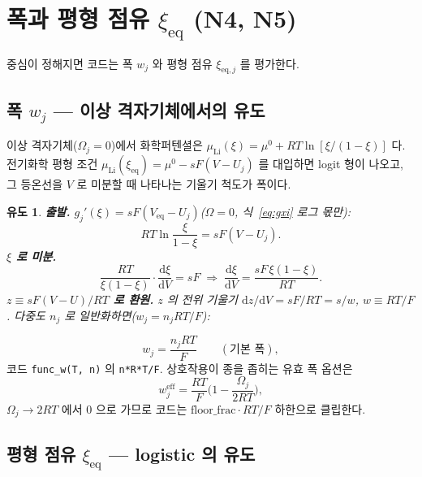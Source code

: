 \documentclass[11pt,a4paper]{article}
\newtheorem*{derivebox}{유도}
\newcommand{\dd}{\mathrm{d}}
\newcommand{\eff}{\mathrm{eff}}
\newcommand{\eq}{\mathrm{eq}}
\newcommand{\code}[1]{\texttt{#1}}
\begin{document}
\section{폭과 평형 점유 $\xi_\eq$ (N4, N5)}\label{sec:width}
중심이 정해지면 코드는 폭 $w_j$ 와 평형 점유 $\xi_{\eq,j}$ 를 평가한다.

\subsection{폭 $w_j$ — 이상 격자기체에서의 유도}

이상 격자기체($\Omega_j=0$)에서 화학퍼텐셜은 $\mu_{\mathrm{Li}}(\xi)=\mu^0+RT\ln[\xi/(1-\xi)]$ 다.
전기화학 평형 조건 $\mu_{\mathrm{Li}}(\xi_\eq)=\mu^0-sF(V-U_j)$ 를 대입하면 logit 형이 나오고, 그 등온선을 $V$ 로 미분할 때 나타나는 기울기 척도가 폭이다.

\begin{derivebox}
\textbf{출발.} $g_j'(\xi)=sF(V_\eq-U_j)$($\Omega=0$, 식~\eqref{eq:gxi} 로그 몫만):
\begin{equation*}
RT\ln\frac{\xi}{1-\xi}=sF(V-U_j).
\end{equation*}
\textbf{$\xi$ 로 미분.}
\begin{equation*}
\frac{RT}{\xi(1-\xi)}\cdot\frac{\dd\xi}{\dd V}=sF
\;\Longrightarrow\;
\frac{\dd\xi}{\dd V}=\frac{sF\,\xi(1-\xi)}{RT}.
\end{equation*}
\textbf{$z\equiv sF(V-U)/RT$ 로 환원.} $z$ 의 전위 기울기 $\dd z/\dd V=sF/RT=s/w$, $w\equiv RT/F$. 다중도 $n_j$ 로 일반화하면($w_j=n_jRT/F$):
\end{derivebox}
\begin{equation}
w_j=\frac{n_jRT}{F}\qquad(\text{기본 폭}),
\label{eq:wbase}
\end{equation}
코드 \code{func\_w(T, n)} 의 \code{n*R*T/F}. 상호작용이 종을 좁히는 유효 폭 옵션은
\begin{equation}
w_j^\eff=\frac{RT}{F}\Big(1-\frac{\Omega_j}{2RT}\Big),
\label{eq:weff}
\end{equation}
$\Omega_j\to2RT$ 에서 $0$ 으로 가므로 코드는 $\mathrm{floor\_frac}\cdot RT/F$ 하한으로 클립한다.

\subsection{평형 점유 $\xi_\eq$ — logistic 의 유도}
\end{document}
